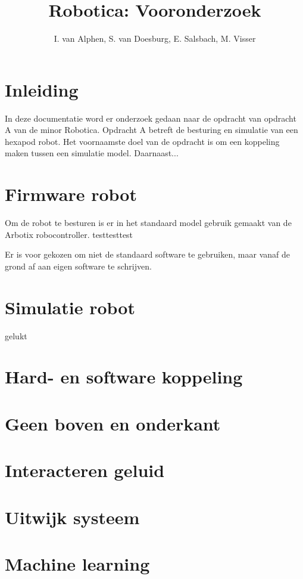 \documentclass[10pt,a4paper]{article}
\title{Robotica: Vooronderzoek}
\author{I. van Alphen, S. van Doesburg, E.  Salsbach, M. Visser}
\begin{document}
\maketitle

\section{Inleiding}
In deze documentatie word er onderzoek gedaan naar de opdracht van opdracht A van de minor Robotica. Opdracht A betreft de besturing en simulatie van een hexapod robot. Het voornaamste doel van de opdracht is om een koppeling maken tussen een simulatie model. Daarnaast...

\section{Firmware robot}
Om de robot te besturen is er in het standaard model gebruik gemaakt van de Arbotix robocontroller. 
testtesttest

Er is voor gekozen om niet de standaard software te gebruiken, maar vanaf de grond af aan eigen software te schrijven.

\section{Simulatie robot}
gelukt

\section{Hard- en software koppeling}


\section{Geen boven en onderkant}

\section{Interacteren geluid}

\section{Uitwijk systeem}

\section{Machine learning}
\end{document}
